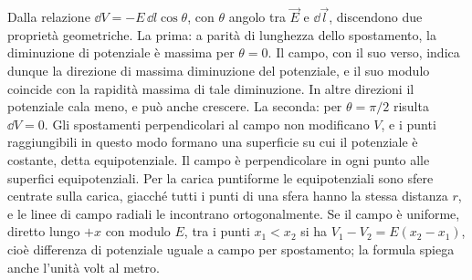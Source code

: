 \documentclass[11pt,a4paper]{article}
\begin{document}
Dalla relazione $\dd V=-E\,\dd l\cos\theta$, con $\theta$ angolo tra $\vec E$ e $\dd\vec l$, discendono due proprietà geometriche. La prima: a parità di lunghezza dello spostamento, la diminuzione di potenziale è massima per $\theta=0$. Il campo, con il suo verso, indica dunque la direzione di massima diminuzione del potenziale, e il suo modulo coincide con la rapidità massima di tale diminuzione. In altre direzioni il potenziale cala meno, e può anche crescere. La seconda: per $\theta=\pi/2$ risulta $\dd V=0$. Gli spostamenti perpendicolari al campo non modificano $V$, e i punti raggiungibili in questo modo formano una superficie su cui il potenziale è costante, detta equipotenziale. Il campo è perpendicolare in ogni punto alle superfici equipotenziali. Per la carica puntiforme le equipotenziali sono sfere centrate sulla carica, giacché tutti i punti di una sfera hanno la stessa distanza $r$, e le linee di campo radiali le incontrano ortogonalmente. Se il campo è uniforme, diretto lungo $+x$ con modulo $E$, tra i punti $x_1<x_2$ si ha $V_1-V_2=E(x_2-x_1)$, cioè differenza di potenziale uguale a campo per spostamento; la formula spiega anche l'unità volt al metro.
\end{document}
